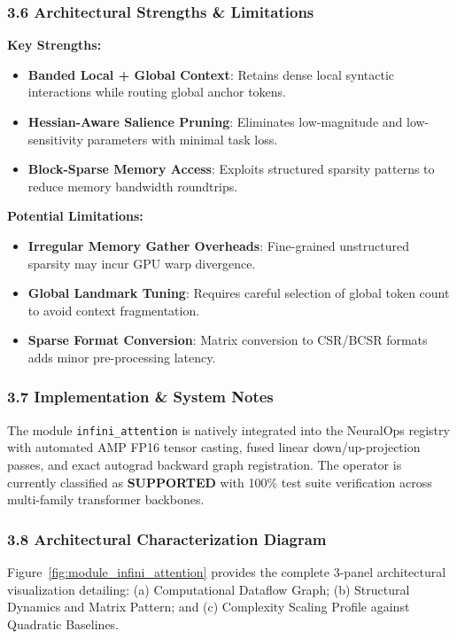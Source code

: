 \subsubsection*{3.6 Architectural Strengths \& Limitations}
\textbf{Key Strengths:}
\begin{itemize}
    \item \textbf{Banded Local + Global Context}: Retains dense local syntactic interactions while routing global anchor tokens.
    \item \textbf{Hessian-Aware Salience Pruning}: Eliminates low-magnitude and low-sensitivity parameters with minimal task loss.
    \item \textbf{Block-Sparse Memory Access}: Exploits structured sparsity patterns to reduce memory bandwidth roundtrips.
\end{itemize}

\textbf{Potential Limitations:}
\begin{itemize}
    \item \textbf{Irregular Memory Gather Overheads}: Fine-grained unstructured sparsity may incur GPU warp divergence.
    \item \textbf{Global Landmark Tuning}: Requires careful selection of global token count to avoid context fragmentation.
    \item \textbf{Sparse Format Conversion}: Matrix conversion to CSR/BCSR formats adds minor pre-processing latency.
\end{itemize}

\subsubsection*{3.7 Implementation \& System Notes}
The module \texttt{infini\_attention} is natively integrated into the NeuralOps registry with automated AMP FP16 tensor casting, fused linear down/up-projection passes, and exact autograd backward graph registration. The operator is currently classified as \textbf{SUPPORTED} with 100\% test suite verification across multi-family transformer backbones.

\subsubsection*{3.8 Architectural Characterization Diagram}
Figure~\ref{fig:module_infini_attention} provides the complete 3-panel architectural visualization detailing: (a) Computational Dataflow Graph; (b) Structural Dynamics and Matrix Pattern; and (c) Complexity Scaling Profile against Quadratic Baselines.

